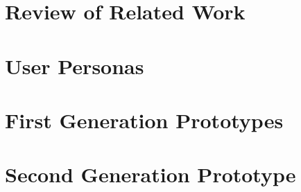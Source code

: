 \documentclass[a4paper,10pt]{article}
\begin{document}



\newpage\null\thispagestyle{empty}\newpage
\setcounter{page}{0}
\tableofcontents
{}
\restoregeometry%
\newpage

\section{Review of Related Work}
\label{sec:review_of_related_work}








\section{User Personas}
\label{sec:user_personas}



	
	
	
	


\section{First Generation Prototypes}
\label{sec:first_prototypes}








\clearpage

\section{Second Generation Prototype}
\label{sec:second_generation_prototype}






\end{document}
